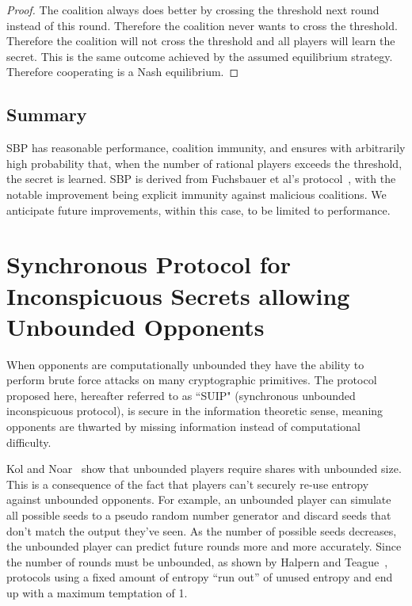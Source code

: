 \documentclass{dalcsthesis}
\begin{document}
\begin{proof}
The coalition always does better by crossing the threshold next round instead of this round. Therefore the coalition never wants to cross the threshold. Therefore the coalition will not cross the threshold and all players will learn the secret. This is the same outcome achieved by the assumed equilibrium strategy. Therefore cooperating is a Nash equilibrium.
\end{proof}


\subsection{Summary}

SBP has reasonable performance, coalition immunity, and ensures with arbitrarily high probability that, when the number of rational players exceeds the threshold, the secret is learned. SBP is derived from Fuchsbauer et al's protocol~\cite{fuch10}, with the notable improvement being explicit immunity against malicious coalitions. We anticipate future improvements, within this case, to be limited to performance.



\section{Synchronous Protocol for Inconspicuous Secrets allowing Unbounded Opponents}

When opponents are computationally unbounded they have the ability to perform brute force attacks on many cryptographic primitives. The protocol proposed here, hereafter referred to as ``SUIP" (synchronous unbounded inconspicuous protocol), is secure in the information theoretic sense, meaning opponents are thwarted by missing information instead of computational difficulty.

Kol and Noar~\cite{kol08} show that unbounded players require shares with unbounded size. This is a consequence of the fact that players can't securely re-use entropy against unbounded opponents. For example, an unbounded player can simulate all possible seeds to a pseudo random number generator and discard seeds that don't match the output they've seen. As the number of possible seeds decreases, the unbounded player can predict future rounds more and more accurately. Since the number of rounds must be unbounded, as shown by Halpern and Teague~\cite{halpern04}, protocols using a fixed amount of entropy ``run out'' of unused entropy and end up with a maximum temptation of 1.
\end{document}

